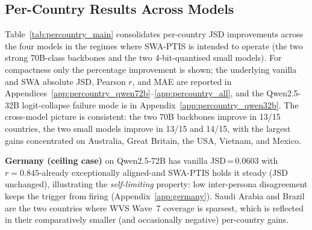 \documentclass{article}
\begin{document}
\subsection{Per-Country Results Across Models}
\label{sec:percountry_main}

Table~\ref{tab:percountry_main} consolidates per-country JSD improvements
across the four models in the regimes where SWA-PTIS is intended to operate
(the two strong 70B-class backbones and the two 4-bit-quantised small
models). For compactness only the percentage improvement is shown; the
underlying vanilla and SWA absolute JSD, Pearson $r$, and MAE are reported in
Appendices~\ref{app:percountry_qwen72b}--\ref{app:percountry_all}, and the
Qwen2.5-32B logit-collapse failure mode is in
Appendix~\ref{app:percountry_qwen32b}. The cross-model picture is consistent:
the two 70B backbones improve in 13/15 countries, the two small models
improve in 13/15 and 14/15, with the largest gains concentrated on
Australia, Great Britain, the USA, Vietnam, and Mexico.

\textbf{Germany (ceiling case)} on Qwen2.5-72B has vanilla JSD\,=\,0.0603 with
$r=0.845$-already exceptionally aligned-and SWA-PTIS holds it steady
(JSD unchanged), illustrating the \emph{self-limiting} property: low
inter-persona disagreement keeps the trigger from firing
(Appendix~\ref{app:germany}). Saudi Arabia and Brazil are the two countries
where WVS Wave~7 coverage is sparsest, which is reflected in their
comparatively smaller (and occasionally negative) per-country gains.
\end{document}
